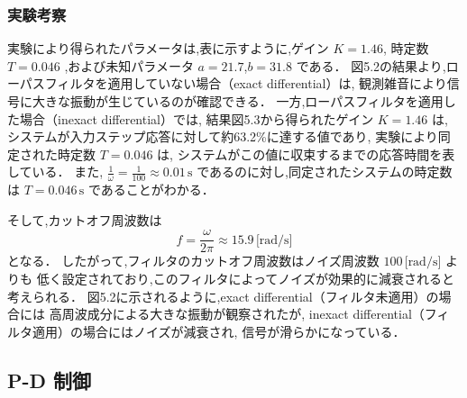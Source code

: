 \newpage

\subsubsection{実験考察}

実験により得られたパラメータは,表に示すように,ゲイン \( K = 1.46 \),
時定数 \( T = 0.046 \) ,および未知パラメータ \( a = 21.7 \),\( b = 31.8 \) である．
図5.2の結果より,ローパスフィルタを適用していない場合（exact differential）は,
観測雑音により信号に大きな振動が生じているのが確認できる．
一方,ローパスフィルタを適用した場合（inexact differential）では,
結果図5.3から得られたゲイン \( K = 1.46 \) は,
システムが入力ステップ応答に対して約63.2\%に達する値であり,
実験により同定された時定数 \( T = 0.046 \) は,
システムがこの値に収束するまでの応答時間を表している．
また, \( \frac{1}{\omega} = \frac{1}{100} \approx 0.01 \, 
\text{s} \) であるのに対し,同定されたシステムの時定数は \( T = 0.046 \, \text{s} \)
であることがわかる．

そして,カットオフ周波数は
\[
  f = \frac{\omega}{2 \pi} \approx 15.9 \, \text{[rad/s]}
\]
となる．
したがって,フィルタのカットオフ周波数はノイズ周波数 \( 100 \, \text{[rad/s]} \) よりも
低く設定されており,このフィルタによってノイズが効果的に減衰されると考えられる．
図5.2に示されるように,exact differential（フィルタ未適用）の場合には
高周波成分による大きな振動が観察されたが,
inexact differential（フィルタ適用）の場合にはノイズが減衰され,
信号が滑らかになっている．


\subsection{P-D 制御}

